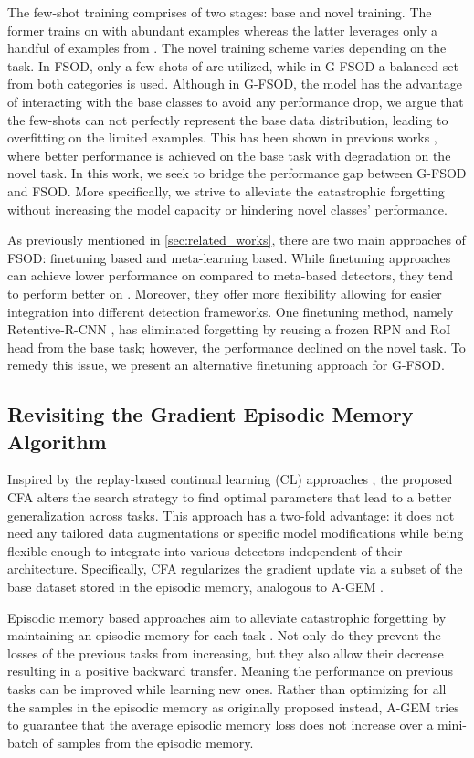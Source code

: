 \documentclass[10pt,twocolumn,letterpaper]{article}
\begin{document}
The few-shot training comprises of two stages: base and novel training. The former trains on  with abundant examples whereas the latter leverages only a handful of examples from . The novel training scheme varies depending on the task. In FSOD, only a few-shots of  are utilized, while in G-FSOD a balanced set from both categories is used. 
Although in G-FSOD, the model has the advantage of interacting with the base classes to avoid any performance drop, we argue that the few-shots can not perfectly represent the base data distribution, leading to overfitting on the limited examples. This has been shown in previous works \cite{TFA, gfsod, defrcn}, where better performance is achieved on the base task with degradation on the novel task. In this work, we seek to bridge the performance gap between G-FSOD and FSOD. More specifically, we strive to alleviate the catastrophic forgetting without increasing the model capacity or hindering novel classes' performance.

As previously mentioned in \cref{sec:related_works}, there are two main approaches of FSOD: finetuning based and meta-learning based. While finetuning approaches can achieve lower performance on  compared to meta-based detectors, they tend to perform better on . Moreover, they offer more flexibility allowing for easier integration into different detection frameworks. One finetuning method, namely Retentive-R-CNN \cite{gfsod}, has eliminated forgetting by reusing a frozen RPN and RoI head from the base task; however, the performance declined on the novel task. To remedy this issue, we present an alternative finetuning approach for G-FSOD.  


\subsection{Revisiting the Gradient Episodic Memory Algorithm}
\label{subsec:constrained_approach}
Inspired by the replay-based continual learning (CL) approaches \cite{gem, agem}, the proposed CFA alters the search strategy to find optimal parameters that lead to a better generalization across tasks. This approach has a two-fold advantage: it does not need any tailored data augmentations or specific model modifications while being flexible enough to integrate into various detectors independent of their architecture. Specifically, CFA regularizes the gradient update via a subset of the base dataset stored in the episodic memory, analogous to A-GEM \cite{agem}. 

Episodic memory based approaches \cite{gem, agem, MER, gss} aim to alleviate catastrophic forgetting by maintaining an episodic memory  for each task . Not only do they prevent the losses of the previous tasks from increasing, but they also allow their decrease resulting in a positive backward transfer. Meaning the performance on previous tasks can be improved while learning new ones. Rather than optimizing for all the samples in the episodic memory as originally proposed \cite{gem} instead, A-GEM \cite{agem} tries to guarantee that the average episodic memory loss does not increase over a mini-batch of samples from the episodic memory. 
\end{document}

